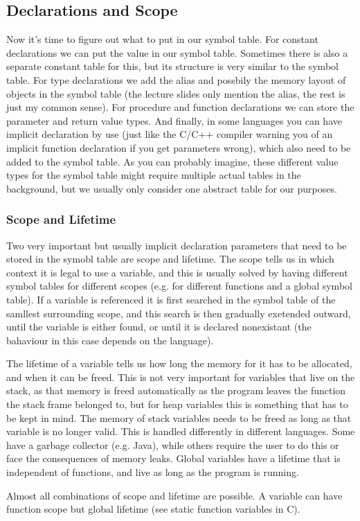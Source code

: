 \documentclass{article}
\begin{document}
\subsection{Declarations and Scope}
Now it's time to figure out what to put in our symbol table.
For constant declarations we can put the value in our symbol table.
Sometimes there is also a separate constant table for this, but its structure is very similar to the symbol table.
For type declarations we add the alias and possbily the memory layout of objects in the symbol table (the lecture slides only mention the alias, the rest is just my common sense).
For procedure and function declarations we can store the parameter and return value types.
And finally, in some languages you can have implicit declaration by use (just like the C/C++ compiler warning you of an implicit function declaration if you get parameters wrong), which also need to be added to the symbol table.
As you can probably imagine, these different value types for the symbol table might require multiple actual tables in the background, but we usually only consider one abstract table for our purposes.

\subsubsection{Scope and Lifetime}
Two very important but usually implicit declaration parameters that need to be stored in the symobl table are scope and lifetime.
The scope tells us in which context it is legal to use a variable, and this is usually solved by having different symbol tables for different scopes (e.g. for different functions and a global symbol table).
If a variable is referenced it is first searched in the symbol table of the samllest surrounding scope, and this search is then gradually exetended outward, until the variable is either found, or until it is declared nonexistant (the bahaviour in this case depends on the language).

The lifetime of a variable tells us how long the memory for it has to be allocated, and when it can be freed.
This is not very important for variables that live on the stack, as that memory is freed automatically as the program leaves the function the stack frame belonged to, but for heap variables this is something that has to be kept in mind.
The memory of stack variables needs to be freed as long as that variable is no longer valid.
This is handled differently in different languages.
Some have a garbage collector (e.g. Java), while others require the user to do this or face the consequences of memory leaks.
Global variables have a lifetime that is independent of functions, and live as long as the program is running.
\begin{keypointbox}
	Almost all combinations of scope and lifetime are possible.
	A variable can have function scope but global lifetime (see static function variables in C).
\end{keypointbox}
\end{document}
